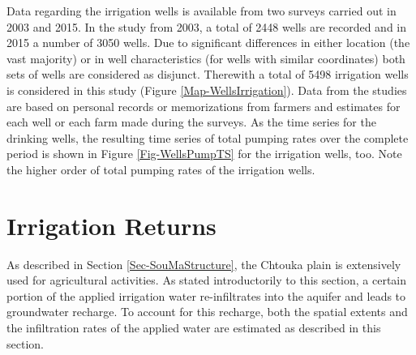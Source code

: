 Data regarding the irrigation wells is available from two surveys carried out in 2003 and 2015. 
In the study from 2003, a total of 2448 wells are recorded and in 2015 a number of 3050 wells. 
Due to significant differences in either location (the vast majority) or in well characteristics (for wells with similar coordinates) both sets of wells are considered as disjunct. 
Therewith a total of 5498 irrigation wells is considered in this study (Figure \ref{Map-WellsIrrigation}). 
Data from the studies are based on personal records or memorizations from farmers and estimates for each well or each farm made during the surveys.
As the time series for the drinking wells, the resulting time series of total pumping rates over the complete period is shown in Figure \ref{Fig-WellsPumpTS} for the irrigation wells, too.
Note the higher order of total pumping rates of the irrigation wells.



\section{Irrigation Returns}
\label{Sec-IrrRech}

As described in Section \ref{Sec-SouMaStructure}, the Chtouka plain is extensively used for agricultural activities. 
As stated introductorily to this section, a certain portion of the applied irrigation water re-infiltrates into the aquifer and leads to groundwater recharge. 
To account for this recharge, both the spatial extents and the infiltration rates of the applied water are estimated as described in this section.

